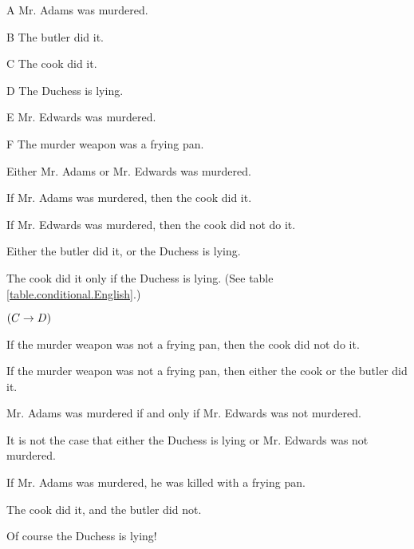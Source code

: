 \problempart 
\begin{ekey}
\item[A] Mr. Adams was murdered.
\item[B] The butler did it.
\item[C] The cook did it.
\item[D] The Duchess is lying.
\item[E] Mr. Edwards was murdered.
\item[F] The murder weapon was a frying pan.
\end{ekey}
\begin{earg}
\item Either Mr. Adams or Mr. Edwards was murdered.
\item[] 
\item If Mr. Adams was murdered, then the cook did it.
\item[] 
\item If Mr. Edwards was murdered, then the cook did not do it.
\item[] 
\item Either the butler did it, or the Duchess is lying.
\item[] 
\item The cook did it only if the Duchess is lying. (See table \ref{table.conditional.English}.) 
\item[] $(C \rightarrow D)$
\item If the murder weapon was not a frying pan, then the cook did not do it.
\item[] 
\item If the murder weapon was not a frying pan, then either the cook or the butler did it.
\item[] 
\item Mr. Adams was murdered if and only if Mr. Edwards was not murdered.
\item[] 
\item It is not the case that either the Duchess is lying or Mr. Edwards was not murdered.
\item[] 
\item If Mr. Adams was murdered, he was killed with a frying pan.
\item[] 
\item The cook did it, and the butler did not.
\item[] 
\item Of course the Duchess is lying!
\item[] 
\end{earg}


